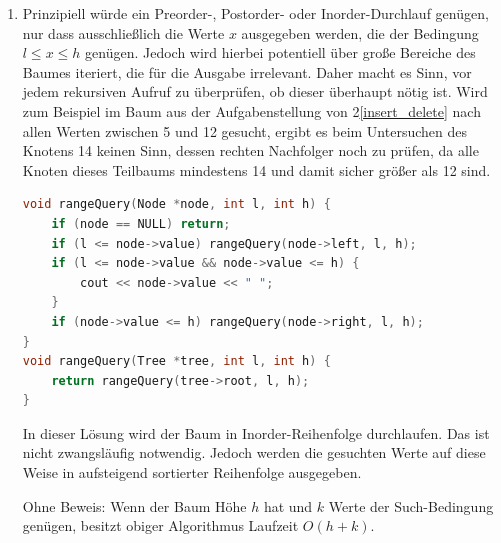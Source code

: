 \documentclass[11pt,a4paper]{article}
\begin{document}
\begin{loesung}
\begin{enumerate}
        \item 
        Prinzipiell würde ein Preorder-, Postorder- oder Inorder-Durchlauf genügen, nur dass ausschließlich die Werte $x$ ausgegeben werden, die der Bedingung $l \leq x \leq h$ genügen.
        Jedoch wird hierbei potentiell über große Bereiche des Baumes iteriert, die für die Ausgabe irrelevant.
        Daher macht es Sinn, vor jedem rekursiven Aufruf zu überprüfen, ob dieser überhaupt nötig ist.
        Wird zum Beispiel im Baum aus der Aufgabenstellung von 2\ref*{insert_delete} nach allen Werten zwischen 5 und 12 gesucht, ergibt es beim Untersuchen des Knotens 14 keinen Sinn, dessen rechten Nachfolger noch zu prüfen, da alle Knoten dieses Teilbaums mindestens 14 und damit sicher größer als 12 sind.
        \begin{lstlisting}[language=c++]
void rangeQuery(Node *node, int l, int h) {
    if (node == NULL) return;
    if (l <= node->value) rangeQuery(node->left, l, h);
    if (l <= node->value && node->value <= h) {
        cout << node->value << " ";
    }
    if (node->value <= h) rangeQuery(node->right, l, h);
}
void rangeQuery(Tree *tree, int l, int h) {
    return rangeQuery(tree->root, l, h);
}
        \end{lstlisting}
        In dieser Lösung wird der Baum in Inorder-Reihenfolge durchlaufen.
        Das ist nicht zwangsläufig notwendig.
        Jedoch werden die gesuchten Werte auf diese Weise in aufsteigend sortierter Reihenfolge ausgegeben.

        Ohne Beweis: Wenn der Baum Höhe $h$ hat und $k$ Werte der Such-Bedingung genügen, besitzt obiger Algorithmus Laufzeit $O(h + k)$.
    \end{enumerate}
\end{loesung}
\end{document}
